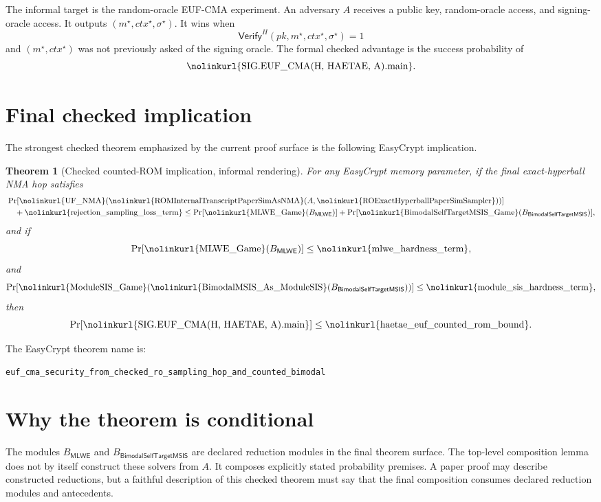 \documentclass[11pt]{report}
\DeclareRobustCommand{\ec}[1]{\ifmmode\text{\nolinkurl{#1}}\else\nolinkurl{#1}\fi}
\newcommand{\MLWE}{\mathsf{MLWE}}
\newcommand{\BMSIS}{\mathsf{BimodalSelfTargetMSIS}}
\newcommand{\Prb}{\Pr}
\theoremstyle{definition}
\theoremstyle{plain}
\newtheorem{theorem}{Theorem}[chapter]
\begin{document}
The informal target is the random-oracle EUF-CMA experiment.  An adversary
\(A\) receives a public key, random-oracle access, and signing-oracle access.
It outputs \((m^\star,ctx^\star,\sigma^\star)\).  It wins when
\[
  \mathsf{Verify}^{H}(pk,m^\star,ctx^\star,\sigma^\star)=1
\]
and \((m^\star,ctx^\star)\) was not previously asked of the signing oracle.
The formal checked advantage is the success probability of
\[
  \ec{SIG.EUF\_CMA(H, HAETAE, A).main}.
\]

\section{Final checked implication}

The strongest checked theorem emphasized by the current proof surface is the
following EasyCrypt implication.

\begin{theorem}[Checked counted-ROM implication, informal rendering]
For any EasyCrypt memory parameter, if the final exact-hyperball NMA hop
satisfies
\[
\begin{aligned}
&\Prb[\ec{UF\_NMA}(\ec{ROMInternalTranscriptPaperSimAsNMA}
  (A,\ec{ROExactHyperballPaperSimSampler}))]  \\
&\quad + \ec{rejection\_sampling\_loss\_term}
  \le
  \Prb[\ec{MLWE\_Game}(B_{\MLWE})]
  + \Prb[\ec{BimodalSelfTargetMSIS\_Game}(B_{\BMSIS})],
\end{aligned}
\]
and if
\[
  \Prb[\ec{MLWE\_Game}(B_{\MLWE})]
  \le \ec{mlwe\_hardness\_term},
\]
and
\[
  \Prb[\ec{ModuleSIS\_Game}
      (\ec{BimodalMSIS\_As\_ModuleSIS}(B_{\BMSIS}))]
  \le \ec{module\_sis\_hardness\_term},
\]
then
\[
  \Prb[\ec{SIG.EUF\_CMA(H, HAETAE, A).main}]
  \le
  \ec{haetae\_euf\_counted\_rom\_bound}.
\]
\end{theorem}

The EasyCrypt theorem name is:

\begin{lstlisting}[language=EasyCrypt]
euf_cma_security_from_checked_ro_sampling_hop_and_counted_bimodal
\end{lstlisting}

\section{Why the theorem is conditional}

The modules \(B_{\MLWE}\) and \(B_{\BMSIS}\) are declared reduction modules in
the final theorem surface.  The top-level composition lemma does not by itself
construct these solvers from \(A\).  It composes explicitly stated probability
premises.  A paper proof may describe constructed reductions, but a faithful
description of this checked theorem must say that the final composition consumes
declared reduction modules and antecedents.
\end{document}
